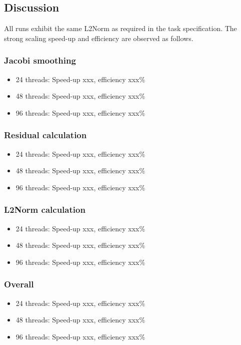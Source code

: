 \documentclass[11pt,a4paper]{article}
\begin{document}
\subsection{Discussion}
All runs exhibit the same L2Norm as required in the task specification.
The strong scaling speed-up and efficiency are observed as follows.

\subsubsection{Jacobi smoothing}
\begin{itemize}
	\item 24 threads: Speed-up xxx, efficiency xxx\%
	\item 48 threads: Speed-up xxx, efficiency xxx\%
	\item 96 threads: Speed-up xxx, efficiency xxx\%
\end{itemize}
\subsubsection{Residual calculation}
\begin{itemize}
	\item 24 threads: Speed-up xxx, efficiency xxx\%
	\item 48 threads: Speed-up xxx, efficiency xxx\%
	\item 96 threads: Speed-up xxx, efficiency xxx\%
\end{itemize}
\subsubsection{L2Norm calculation}
\begin{itemize}
	\item 24 threads: Speed-up xxx, efficiency xxx\%
	\item 48 threads: Speed-up xxx, efficiency xxx\%
	\item 96 threads: Speed-up xxx, efficiency xxx\%
\end{itemize}

\subsubsection{Overall}
\begin{itemize}
	\item 24 threads: Speed-up xxx, efficiency xxx\%
	\item 48 threads: Speed-up xxx, efficiency xxx\%
	\item 96 threads: Speed-up xxx, efficiency xxx\%
\end{itemize}
\end{document}

